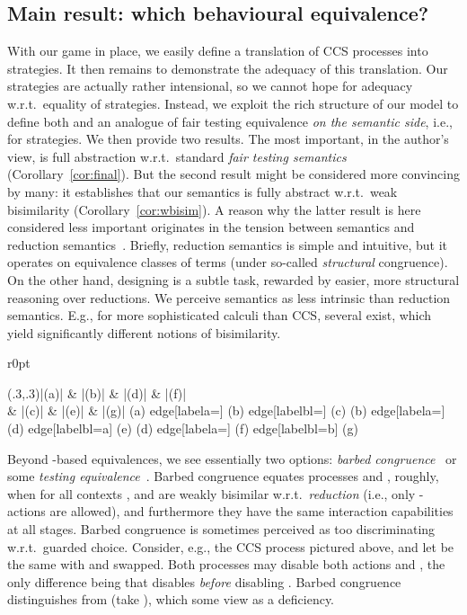 \documentclass{LMCS}
\theoremstyle{plain}\newtheorem{satz}[thm]{Satz}
\renewcommand{\stratlocales}{strategies\xspace}
\begin{document}
\subsection{Main result: which behavioural equivalence?}
With our game in place, we easily define a translation of CCS
processes into \stratlocales. It then remains to demonstrate the
adequacy of this translation.  Our \stratlocales are actually rather
intensional, so we cannot hope for adequacy w.r.t.\ equality of
\stratlocales.  Instead, we exploit the rich structure of our model to
define both \anlts{} and an analogue of fair testing equivalence
\emph{on the semantic side}, i.e., for \stratlocales.  We then provide
two results. The most important, in the author's view, is full
abstraction w.r.t.\ standard \emph{fair testing semantics}
(Corollary~\ref{cor:final}). But the second result might be considered
more convincing by many: it establishes that our semantics is fully
abstract w.r.t.\ weak bisimilarity (Corollary~\ref{cor:wbisim}).
A reason why the latter result is here considered less important
originates in the tension between \lts{} semantics and reduction
semantics~\cite{modularLTS}. Briefly, reduction semantics is simple
and intuitive, but it operates on equivalence classes of terms (under
so-called \emph{structural} congruence). On the other hand, designing
\ltss{} is a subtle task, rewarded by easier, more structural
reasoning over reductions. We perceive \lts{} semantics as less
intrinsic than reduction semantics. E.g., for more sophisticated
calculi than CCS, several \ltss{} exist, which yield significantly
different notions of bisimilarity.

\begin{wrapfigure}[3]{r}{0pt}
  \begin{minipage}[c]{0.23\linewidth}
    \vspace*{-1.5em}
    \diag(.3,.3){|(a)| \bullet \& |(b)| \bullet \& |(d)| \bullet
      \& |(f)| \bullet \\
      \& |(c)| \bullet \& |(e)| \bullet \& |(g)| \bullet }{(a) edge[labela={\tau}] (b) edge[labelbl={\tau}] (c) (b) edge[labela={\tau}] (d) edge[labelbl={a}] (e) (d) edge[labela={\tau}] (f) edge[labelbl={b}] (g) }
\end{minipage}
\end{wrapfigure}
Beyond \lts{}-based
equivalences, we see essentially two options: \emph{barbed
  congruence}~\cite{DBLP:books/daglib/0004377} or some \emph{testing
  equivalence}~\cite{DBLP:journals/tcs/NicolaH84}.
Barbed congruence equates processes  and , roughly, when for all
contexts ,  and  are weakly bisimilar w.r.t.\
\emph{reduction} (i.e., only -actions are allowed), and
furthermore they have the same interaction capabilities at all
stages. Barbed congruence is sometimes perceived as too discriminating
w.r.t.\ guarded choice. Consider, e.g., the CCS process  pictured
above, and let  be the same with  and  swapped.  Both
processes may disable both actions  and , the only difference
being that  disables  \emph{before} disabling .  Barbed
congruence distinguishes  from  (take ), which some view as a deficiency.
\end{document}
